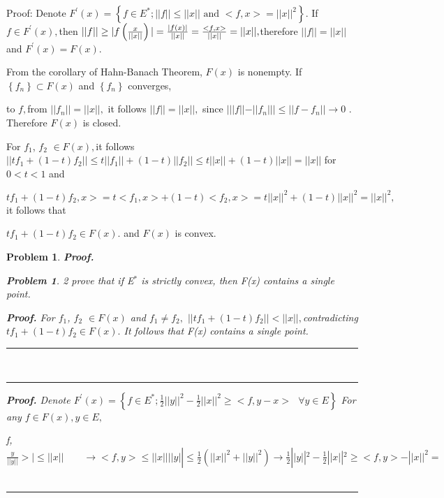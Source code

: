 \documentclass{article}
\newtheorem{problem}[theorem]{Problem}
\newenvironment{proof}[1][Proof]{\noindent\textbf{#1.} }{\ \rule{0.5em}{0.5em}}
\begin{document}

\bigskip Proof: Denote $F^{\prime }\left( x\right) =\left\{ f\in E^{\ast
};||f||\leq ||x||\text{ and }<f,x>=||x||^{2}\right\} .$ If $f\in F^{\prime
}\left( x\right) ,$then $||f||\geq |f\left( \frac{x}{||x||}\right) |=\frac{%
|f\left( x\right) |}{||x||}=\frac{<f,x>}{||x||}=||x||,$therefore $%
||f||=||x|| $ and $F^{\prime }(x)=F(x).$

From the corollary of Hahn-Banach Theorem, $F(x)$ is nonempty. If $\left\{
f_{n}\right\} \subset F(x)$ and $\left\{ f_{n}\right\} $ converges,

to $f,$from $||f_{n}||=||x||,$ it follows $||f||=||x||,$ since $%
|||f||-||f_{n}|||\leq ||f-f_{n}||\rightarrow 0$ . Therefore $F(x)$ is closed.

For $f_{1}$, $f_{2}$ $\in F(x),$it follows $||tf_{1}+(1-t)f_{2}||\leq
t||f_{1}||+(1-t)||f_{2}||\leq t||x||+(1-t)||x||=||x||$ for $0<t<1$ and

\TEXTsymbol{<}$%
tf_{1}+(1-t)f_{2},x>=t<f_{1},x>+(1-t)<f_{2},x>=t||x||^{2}+(1-t)||x||^{2}=||x||^{2}, 
$ it follows that

$tf_{1}+(1-t)f_{2}\in F(x).$ and $F(x)$ is convex.

\begin{problem}
\begin{proof}
\begin{problem}
2 prove that if E$^{\ast }$ is strictly convex, then F(x) contains a single
point.

\begin{proof}
For $f_{1}$, $f_{2}$ $\in F(x)$ and $f_{1}\neq f_{2},$ $%
||tf_{1}+(1-t)f_{2}||<||x||,$contradicting $tf_{1}+(1-t)f_{2}\in F(x).$ It
follows that F(x) contains a single point.
\end{proof}
\end{problem}
\end{proof}


\begin{proof}
Denote $F^{\prime }(x)=\left\{ f\in E^{\ast };\frac{1}{2}||y||^{2}-\frac{1}{2%
}||x||^{2}\geq <f,y-x>\text{ }\forall y\in E\right\} $ For any $f\in
F(x),y\in E,$

\TEXTsymbol{\vert}\TEXTsymbol{<}f,$\frac{y}{||y||}>|\leq ||x||\qquad
\rightarrow <f,y>\leq ||x||||y||\leq \frac{1}{2}(||x||^{2}+||y||^{2})%
\rightarrow \frac{1}{2}||y||^{2}-\frac{1}{2}||x||^{2}\geq <f,y>-||x||^{2}=$
\end{proof}
\end{problem}
\end{document}
